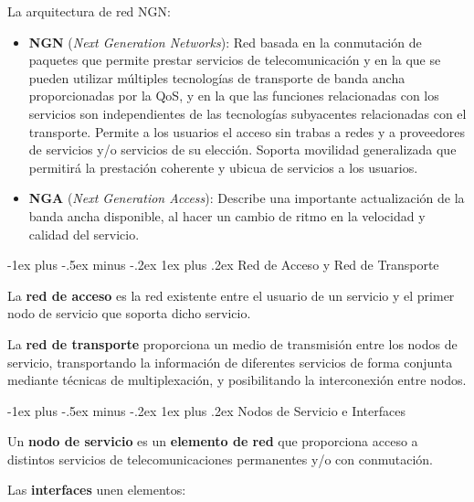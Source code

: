 \documentclass[10pt,portrait, twocolumn]{article}
\makeatletter
\renewcommand{\subsubsection}{\@startsection{subsubsection}{3}{0mm}%
                                {-1ex plus -.5ex minus -.2ex}%
                                {1ex plus .2ex}%
                                {\normalfont\small\bfseries}}
\makeatother
\begin{document}
La arquitectura de red NGN:
	\begin{itemize}
		\item \textbf{NGN} (\textit{Next Generation Networks}): Red basada en la conmutación de paquetes que permite prestar servicios de telecomunicación y en la que se pueden utilizar múltiples tecnologías de transporte de banda ancha proporcionadas por la QoS, y en la que las funciones relacionadas con los servicios son independientes de las tecnologías subyacentes relacionadas con el transporte. Permite a los usuarios el acceso sin trabas a redes y a proveedores de servicios y/o servicios de su elección. Soporta movilidad generalizada que permitirá la prestación coherente y ubicua de servicios a los usuarios.
		\item \textbf{NGA} (\textit{Next Generation Access}): Describe una importante actualización de la banda ancha disponible, al hacer un cambio de ritmo en la velocidad y calidad del servicio.
	\end{itemize}


\subsubsection{Red de Acceso y Red de Transporte}

La \textbf{red de acceso} es la red existente entre el usuario de un servicio y el primer nodo de servicio que soporta dicho servicio.

\quad La \textbf{red de transporte} proporciona un medio de transmisión entre los nodos de servicio, transportando la información de diferentes servicios de forma conjunta mediante técnicas de multiplexación, y posibilitando la interconexión entre nodos.

\subsubsection{Nodos de Servicio e Interfaces}

Un \textbf{nodo de servicio} es un \textbf{elemento de red} que proporciona acceso a distintos servicios de telecomunicaciones permanentes y/o con conmutación.

\quad Las \textbf{interfaces} unen elementos:
\end{document}
